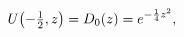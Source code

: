 \[\mathop{U\/}\nolimits\!\left(-\tfrac{1}{2},z\right)=\mathop{D_{0}\/}\nolimits%
\!\left(z\right)=e^{-\frac{1}{4}z^{2}},\]